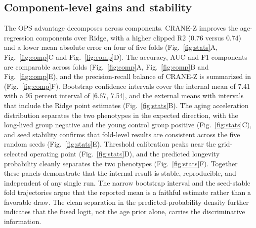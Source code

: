 \documentclass[unnumsec,webpdf,contemporary,large]{oup-authoring-template}
\begin{document}
\subsection{Component-level gains and stability}\label{sec:res2}
The OPS advantage decomposes across components. CRANE-Z improves the age-regression components over Ridge, with a higher clipped R2 (0.76 versus 0.74) and a lower mean absolute error on four of five folds (Fig.~\ref{fig:stats}A, Fig.~\ref{fig:comp}C and Fig.~\ref{fig:comp}D). The accuracy, AUC and F1 components are comparable across folds (Fig.~\ref{fig:comp}A, Fig.~\ref{fig:comp}B and Fig.~\ref{fig:comp}E), and the precision-recall balance of CRANE-Z is summarized in (Fig.~\ref{fig:comp}F). Bootstrap confidence intervals cover the internal mean of 7.41 with a 95 percent interval of [6.67, 7.54], and the external means with intervals that include the Ridge point estimates (Fig.~\ref{fig:stats}B). The aging acceleration distribution separates the two phenotypes in the expected direction, with the long-lived group negative and the young control group positive (Fig.~\ref{fig:stats}C), and seed stability confirms that fold-level results are consistent across the five random seeds (Fig.~\ref{fig:stats}E). Threshold calibration peaks near the grid-selected operating point (Fig.~\ref{fig:stats}D), and the predicted longevity probability cleanly separates the two phenotypes (Fig.~\ref{fig:stats}F). Together these panels demonstrate that the internal result is stable, reproducible, and independent of any single run. The narrow bootstrap interval and the seed-stable fold trajectories argue that the reported mean is a faithful estimate rather than a favorable draw. The clean separation in the predicted-probability density further indicates that the fused logit, not the age prior alone, carries the discriminative information.
\end{document}

